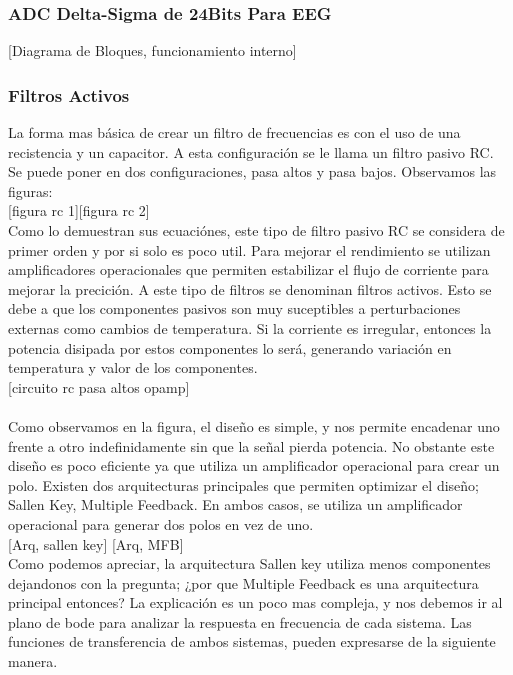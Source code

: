 \subsubsection{ADC Delta-Sigma de 24Bits Para EEG}
\label{sec:org6048541}

[Diagrama de Bloques, funcionamiento interno]\\

\subsubsection{Filtros Activos}
\label{sec:org7862d28}
La forma mas básica de crear un filtro de frecuencias es con el uso de una recistencia y un capacitor. A esta configuración se le llama un filtro pasivo RC. Se puede poner en dos configuraciones, pasa altos y pasa bajos. Observamos las figuras:\\

[figura rc 1][figura rc 2]\\

Como lo demuestran sus ecuaciónes, este tipo de filtro pasivo RC se considera de primer orden y por si solo es poco util. Para mejorar el rendimiento se utilizan amplificadores operacionales que permiten estabilizar el flujo de corriente para mejorar la precición. A este tipo de filtros se denominan filtros activos. Esto se debe a que los componentes pasivos son muy suceptibles a perturbaciones externas como cambios de temperatura. Si la corriente es irregular, entonces la potencia disipada por estos componentes lo será, generando variación en temperatura y valor de los componentes.\\

[circuito rc pasa altos opamp]\\
[circuito rc pasa bajos opamp]\\

Como observamos en la figura, el diseño es simple, y nos permite encadenar uno frente a otro indefinidamente sin que la señal pierda potencia. No obstante este diseño es poco eficiente ya que utiliza un amplificador operacional para crear un polo. Existen dos arquitecturas principales que permiten optimizar el diseño; Sallen Key, Multiple Feedback. En ambos casos, se utiliza un amplificador operacional para generar dos polos en vez de uno.\\

[Arq, sallen key] [Arq, MFB]\\

Como podemos apreciar, la arquitectura Sallen key utiliza menos componentes dejandonos con la pregunta; ¿por que Multiple Feedback es una arquitectura principal entonces? La explicación es un poco mas compleja, y nos debemos ir al plano de bode para analizar la respuesta en frecuencia de cada sistema. Las funciones de transferencia de ambos sistemas, pueden expresarse de la siguiente manera.\\

